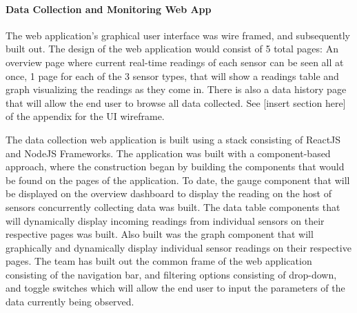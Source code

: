 \paragraph{Data Collection and Monitoring Web App}


The web application's graphical user interface was wire framed, and subsequently built out. The design of the web application would consist of 5 total pages: An overview page where current real-time readings of each sensor can be seen all at once, 1 page for each of the 3 sensor types, that will show a readings table and graph visualizing the readings as they come in. There is also a data history page that will allow the end user to browse all data collected. See [insert section here] of the appendix for the UI wireframe. 

The data collection web application is built using a stack consisting of ReactJS and NodeJS Frameworks. The application was built with a component-based approach, where the construction began by building the components that would be found on the pages of the application. To date, the gauge component that will be displayed on the overview dashboard to display the reading on the host of sensors concurrently collecting data was built. The data table components that will dynamically display incoming readings from individual sensors on their respective pages was built. Also built was the graph component that will graphically and dynamically display individual sensor readings on their respective pages. The team has built out the common frame of the web application consisting of the navigation bar, and filtering options consisting of drop-down, and toggle switches which will allow the end user to input the parameters of the data currently being observed. 

